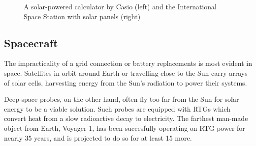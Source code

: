 \documentclass[a4paper,10pt]{article}
\begin{document}
\begin{figure}[h]
\centering
\caption{A solar-powered calculator by Casio (left) and the International Space Station with solar panels (right)~\cite{wiki:solar-cells}}
\end{figure}


\subsection{Spacecraft}

The impracticality of a grid connection or battery replacements is most evident in space. Satellites in orbit around Earth or travelling close to the Sun carry arrays of solar cells, harvesting energy from the Sun's radiation to power their systems. 

Deep-space probes, on the other hand, often fly too far from the Sun for solar energy to be a viable solution. Such probes are equipped with \acp{RTG} which convert heat from a slow radioactive decay to electricity. The farthest man-made object from Earth, Voyager 1, has been succesfully operating on \ac{RTG} power for nearly 35 years, and is projected to do so for at least 15 more. 
\end{document}
